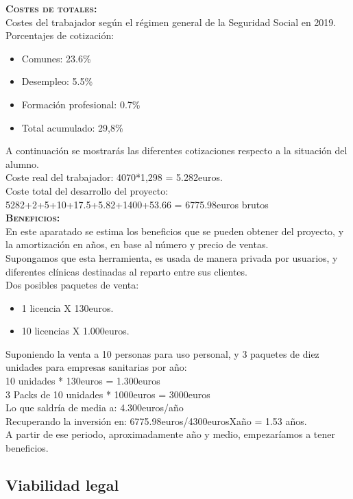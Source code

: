 \textbf{\textsc{Costes de totales:}}\\
Costes del trabajador según el régimen general de la Seguridad Social en 2019. \cite{ssocial} \\
Porcentajes de cotización:
\begin{itemize}
\item Comunes: 23.6\%
\item Desempleo: 5.5\%
\item Formación profesional: 0.7\%
\item Total acumulado: 29,8\%
\end{itemize}
A continuación se mostrarás las diferentes cotizaciones respecto a la situación del alumno.\\
Coste real del trabajador: 4070*1,298 =  5.282euros.\\
Coste total del desarrollo del proyecto:\\
5282+2+5+10+17.5+5.82+1400+53.66 = 6775.98euros brutos\\

\textbf{\textsc{Beneficios:}}\\
En este aparatado se estima los beneficios que se pueden obtener del proyecto, y la amortización en años, en base al número y precio de ventas.\\
Supongamos que esta herramienta, es usada de manera privada por usuarios, y diferentes clínicas destinadas al reparto entre sus clientes.\\
Dos posibles paquetes de venta:
\begin{itemize}
\item 1 licencia X 130euros.
\item 10 licencias X 1.000euros.
\end{itemize}

Suponiendo la venta a 10 personas para uso personal, y 3 paquetes de diez unidades para empresas sanitarias por año:\\
10 unidades * 130euros = 1.300euros\\
3 Packs de 10 unidades * 1000euros = 3000euros\\
Lo que saldría de media a: 4.300euros/año\\
Recuperando la inversión en: 6775.98euros/4300eurosXaño = 1.53 años.\\
A partir de ese periodo, aproximadamente año y medio, empezaríamos a tener beneficios.

\subsection{Viabilidad legal}
